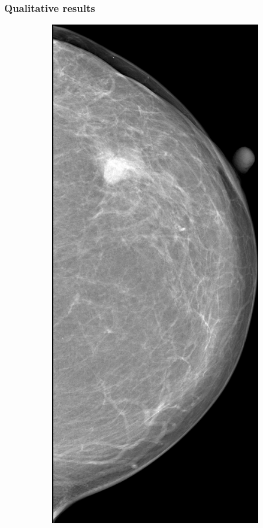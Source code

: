 \documentclass{beamer}
\begin{document}
    \begin{frame}
        \frametitle{Qualitative results}
        \begin{figure}
            \centering
            \begin{subfigure}{0.134\textwidth}
	            \centering
		            \includegraphics[width=\textwidth]{plots/examples/mammogram_2.png}

\end{subfigure}
\end{figure}
\end{frame}
\end{document}
